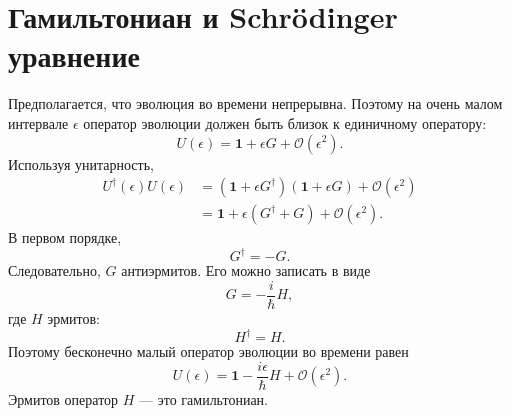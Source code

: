 \begin{classroomqa}
\end{classroomqa}

\section{Гамильтониан и Schr\"odinger уравнение}

Предполагается, что эволюция во времени непрерывна. Поэтому на очень малом интервале \(\epsilon\) оператор эволюции должен быть близок к единичному оператору:
\begin{equation}
U(\epsilon)=\mathbf 1+\epsilon G+\mathcal O(\epsilon^2).
\end{equation}
Используя унитарность,
\begin{align}
U^\dagger(\epsilon)U(\epsilon)
&=
\left(\mathbf 1+\epsilon G^\dagger\right)
\left(\mathbf 1+\epsilon G\right)
+\mathcal O(\epsilon^2)
\\
&=
\mathbf 1+\epsilon(G^\dagger+G)
+\mathcal O(\epsilon^2).
\end{align}
В первом порядке,
\begin{equation}
G^\dagger=-G.
\end{equation}
Следовательно, \(G\) антиэрмитов. Его можно записать в виде
\begin{equation}
G=-\frac{i}{\hbar}H,
\end{equation}
где \(H\) эрмитов:
\begin{equation}
H^\dagger=H.
\end{equation}
Поэтому бесконечно малый оператор эволюции во времени равен
\begin{equation}
U(\epsilon)
=
\mathbf 1-\frac{i\epsilon}{\hbar}H
+\mathcal O(\epsilon^2).
\end{equation}
Эрмитов оператор \(H\) — это гамильтониан.

\begin{classroomqa}
\end{classroomqa}

